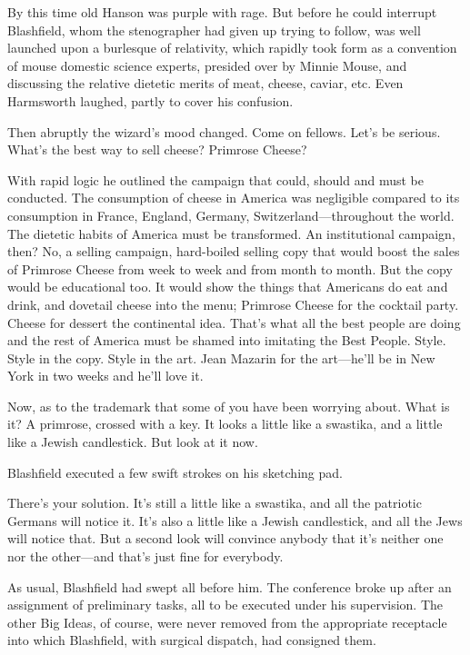 \documentclass[openany,nobib]{tufte-book}
\begin{document}
By this time old Hanson was purple with rage. But before he could
interrupt Blashfield, whom the stenographer had given up trying to
follow, was well launched upon a burlesque of relativity, which rapidly
took form as a convention of mouse domestic science experts, presided
over by Minnie Mouse, and discussing the relative dietetic merits of
meat, cheese, caviar, etc. Even Harmsworth laughed, partly to cover his
confusion.

Then abruptly the wizard's mood changed. Come on fellows. Let's be
serious. What's the best way to sell cheese? Primrose Cheese?

With rapid logic he outlined the campaign that could, should and must be
conducted. The consumption of cheese in America was negligible compared
to its consumption in France, England, Germany, Switzerland---throughout
the world. The dietetic habits of America must be transformed. An
institutional campaign, then? No, a selling campaign, hard-boiled
selling copy that would boost the sales of Primrose Cheese from week to
week and from month to month. But the copy would be educational too. It
would show the things that Americans do eat and drink, and dovetail
cheese into the menu; Primrose Cheese for the cocktail party. Cheese for
dessert the continental idea. That's what all the best people are doing
and the rest of America must be shamed into imitating the Best People.
Style. Style in the copy. Style in the art. Jean Mazarin for the
art---he'll be in New York in two weeks and he'll love it.

Now, as to the trademark that some of you have been worrying about. What
is it? A primrose, crossed with a key. It looks a little like a
swastika, and a little like a Jewish candlestick. But look at it now.

Blashfield executed a few swift strokes on his sketching pad.

There's your solution. It's still a little like a swastika, and all the
patriotic Germans will notice it. It's also a little like a Jewish
candlestick, and all the Jews will notice that. But a second look will
convince anybody that it's neither one nor the other---and that's just
fine for everybody.

As usual, Blashfield had swept all before him. The conference broke up
after an assignment of preliminary tasks, all to be executed under his
supervision. The other Big Ideas, of course, were never removed from the
appropriate receptacle into which Blashfield, with surgical dispatch,
had consigned them.
\end{document}
